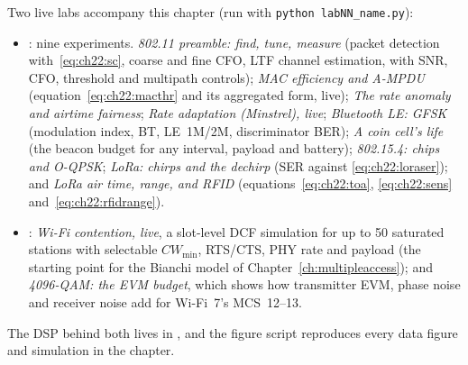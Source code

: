 \begin{labbox}
Two live labs accompany this chapter (run with \texttt{python labNN\_name.py}):
\begin{itemize}
\item {}: nine experiments.
\emph{802.11 preamble: find, tune, measure} (packet detection with~\eqref{eq:ch22:sc}, coarse and fine
CFO, LTF channel estimation, with SNR, CFO, threshold and multipath controls);
\emph{MAC efficiency and A-MPDU} (equation~\eqref{eq:ch22:macthr} and its aggregated form, live);
\emph{The rate anomaly and airtime fairness}; \emph{Rate adaptation (Minstrel), live};
\emph{Bluetooth LE: GFSK} (modulation index, BT, LE~1M/2M, discriminator BER);
\emph{A coin cell's life} (the beacon budget for any interval, payload and battery);
\emph{802.15.4: chips and O-QPSK}; \emph{LoRa: chirps and the dechirp} (SER against
\eqref{eq:ch22:loraser}); and \emph{LoRa air time, range, and RFID} (equations~\eqref{eq:ch22:toa},
\eqref{eq:ch22:sens} and~\eqref{eq:ch22:rfidrange}).
\item {}: \emph{Wi-Fi contention, live}, a
slot-level DCF simulation for up to 50 saturated stations with selectable $CW_{\min}$, RTS/CTS, PHY rate
and payload (the starting point for the Bianchi model of Chapter~\ref{ch:multipleaccess}); and
\emph{4096-QAM: the EVM budget}, which shows how transmitter EVM, phase noise and receiver noise add
for Wi-Fi~7's MCS~12--13.
\end{itemize}
The DSP behind both lives in , and the figure script
 reproduces every data figure and simulation in the chapter.
\end{labbox}

